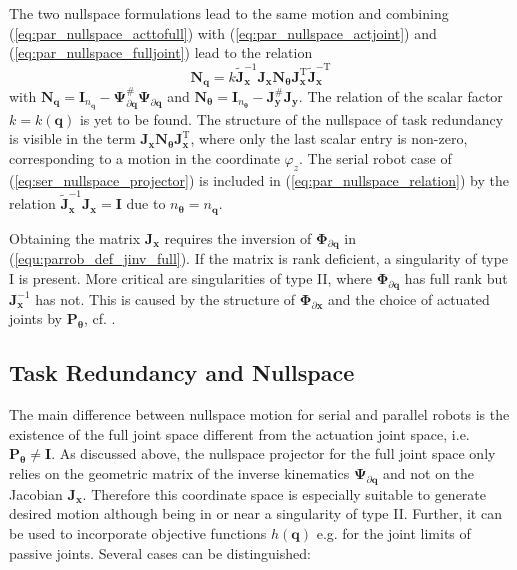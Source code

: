 \documentclass[a4paper,twoside]{article}
\newcommand{\transp}[0]{{\mathrm{T}}}
\begin{document}
The two nullspace formulations lead to the same motion and combining (\ref{eq:par_nullspace_acttofull}) with (\ref{eq:par_nullspace_actjoint})  and (\ref{eq:par_nullspace_fulljoint}) lead to the relation 
\vspace{-0.1cm} %
%
\begin{equation}
\bm{N}_{\bm{q}} = k \tilde{\bm{J}}^{-1}_{\bm{x}} \bm{J}_{\bm{x}} \bm{N}_{\bm{\theta}} \bm{J}_{\bm{x}}^\transp \tilde{\bm{J}}^{-\transp }_{\bm{x}}
\label{eq:par_nullspace_relation}
\end{equation}
%
with $\bm{N}_{\bm{q}}=\bm{I}_{n_{\bm{q}}}-\bm{\Psi}_{\partial \bm{q}}^{\#}\bm{\Psi}_{\partial \bm{q}}$ and $\bm{N}_{\bm{\theta}}=\bm{I}_{n_{\bm{\theta}}}-\bm{J}_{\bm{y}}^{\#}\bm{J}_{\bm{y}}$.
The relation of the scalar factor $k=k(\bm{q})$ is yet to be found.
The structure of the nullspace of task redundancy is visible in the term $ \bm{J}_{\bm{x}} \bm{N}_{\bm{\theta}} \bm{J}_{\bm{x}}^\transp$, where only the last scalar entry is non-zero, corresponding to a motion in the coordinate $\varphi_z$.
The serial robot case of (\ref{eq:ser_nullspace_projector}) is included in (\ref{eq:par_nullspace_relation}) by the relation  $\tilde{\bm{J}}^{-1}_{\bm{x}} \bm{J}_{\bm{x}}=\bm{I}$ due to $n_{\bm{\theta}}=n_{\bm{q}}$. 

Obtaining the matrix $\bm{J}_{\bm{x}}$ requires the inversion of $\bm{\Phi}_{\partial \bm{q}}$ in (\ref{equ:parrob_def_jinv_full}).
If the matrix is rank deficient, a singularity of type I is present.
More critical are singularities of type II, where $\bm{\Phi}_{\partial \bm{q}}$ has full rank but $\bm{J}_{\bm{x}}^{-1}$ has not.
This is caused by the structure of $\bm{\Phi}_{\partial \bm{x}}$ and the choice of actuated joints by $\bm{P}_{\bm{\theta}}$, cf. \cite{Merlet2006a}.


\subsection{Task Redundancy and Nullspace}
\label{sec:nullspace_parrob}

 
The main difference between nullspace motion for serial and parallel robots is the existence of the full joint space different from the actuation joint space, i.e. $\bm{P}_{\bm{\theta}}\neq\bm{I}$. %
As discussed above, the nullspace projector for the full joint space only relies on the geometric matrix of the inverse kinematics $\bm{\Psi}_{\partial \bm{q}}$ and not on the Jacobian $\bm{J}_{\bm{x}}$.
Therefore this coordinate space is especially suitable to generate desired motion although being in or near a singularity of type II.
Further, it can be used to incorporate objective functions $h(\bm{q})$ e.g. for the joint limits of passive joints.
Several cases can be distinguished:
\end{document}
